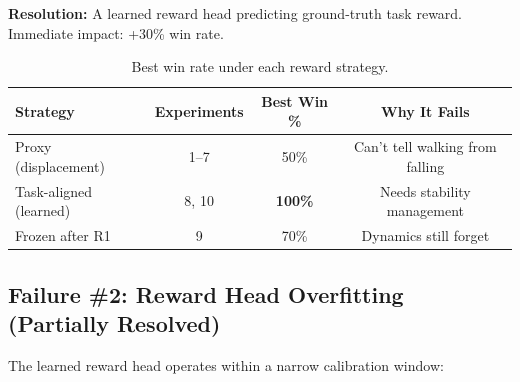 \documentclass{article}
\begin{document}
\textbf{Resolution:} A learned reward head predicting ground-truth task reward. Immediate impact: +30\% win rate.

\begin{table}[H]
\centering
\caption{Best win rate under each reward strategy.}
\label{tab:reward_comp}
\begin{tabular}{lccc}
\toprule
\textbf{Strategy} & \textbf{Experiments} & \textbf{Best Win \%} & \textbf{Why It Fails} \\
\midrule
Proxy (displacement) & 1--7 & 50\% & Can't tell walking from falling \\
\rowcolor{green!8} Task-aligned (learned) & 8, 10 & \textbf{100\%} & Needs stability management \\
Frozen after R1 & 9 & 70\% & Dynamics still forget \\
\bottomrule
\end{tabular}
\end{table}

\subsection{Failure \#2: Reward Head Overfitting (Partially Resolved)}

The learned reward head operates within a narrow calibration window:
\end{document}
